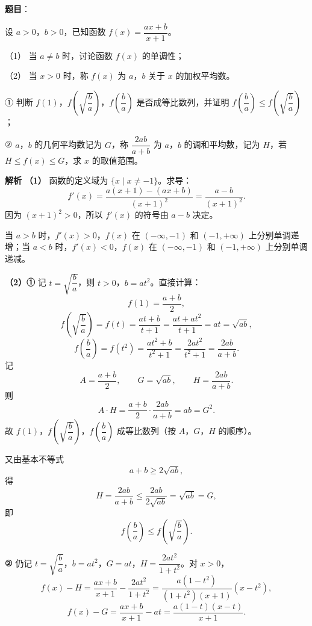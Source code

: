 \begin{answer}

\textbf{题目}：

设 $a>0$，$b>0$，已知函数 $f(x)=\dfrac{ax+b}{x+1}$。

（1） 当 $a\neq b$ 时，讨论函数 $f(x)$ 的单调性；

（2） 当 $x>0$ 时，称 $f(x)$ 为 $a$，$b$ 关于 $x$ 的加权平均数。

① 判断 $f(1)$，$f\left(\sqrt{\dfrac ba}\right)$，$f\left(\dfrac ba\right)$ 是否成等比数列，并证明 $f\left(\dfrac ba\right)\leqslant f\left(\sqrt{\dfrac ba}\right)$；

② $a$，$b$ 的几何平均数记为 $G$，称 $\dfrac{2ab}{a+b}$ 为 $a$，$b$ 的调和平均数，记为 $H$，若 $H\leqslant f(x)\leqslant G$，求 $x$ 的取值范围。

\textbf{解析}
\textbf{（1）} 函数的定义域为 $\{x\mid x\neq-1\}$。求导：
\nopagebreak[4]
\[f'(x)=\frac{a(x+1)-(ax+b)}{(x+1)^2}=\frac{a-b}{(x+1)^2}.\]
因为 $(x+1)^2>0$，所以 $f'(x)$ 的符号由 $a-b$ 决定。

当 $a>b$ 时，$f'(x)>0$，$f(x)$ 在 $(-\infty,-1)$ 和 $(-1,+\infty)$ 上分别单调递增；当 $a<b$ 时，$f'(x)<0$，$f(x)$ 在 $(-\infty,-1)$ 和 $(-1,+\infty)$ 上分别单调递减。

\textbf{（2）①} 记 $t=\sqrt{\dfrac ba}$，则 $t>0$，$b=at^2$。直接计算：
\nopagebreak[4]
\[f(1)=\frac{a+b}{2},\]
\nopagebreak[4]
\[f\left(\sqrt{\frac ba}\right)=f(t)=\frac{at+b}{t+1}
=\frac{at+at^2}{t+1}=at=\sqrt{ab},\]
\nopagebreak[4]
\[f\left(\frac ba\right)=f(t^2)=\frac{at^2+b}{t^2+1}
=\frac{2at^2}{t^2+1}
=\frac{2ab}{a+b}.\]
记
\nopagebreak[4]
\[A=\frac{a+b}{2},\qquad G=\sqrt{ab},\qquad H=\frac{2ab}{a+b}.\]
则
\nopagebreak[4]
\[A\cdot H=\frac{a+b}{2}\cdot\frac{2ab}{a+b}=ab=G^2.\]
故 $f(1)$，$f\left(\sqrt{\dfrac ba}\right)$，$f\left(\dfrac ba\right)$ 成等比数列（按 $A$，$G$，$H$ 的顺序）。

又由基本不等式
\nopagebreak[4]
\[a+b\geqslant2\sqrt{ab},\]
得
\nopagebreak[4]
\[H=\frac{2ab}{a+b}\leqslant\frac{2ab}{2\sqrt{ab}}=\sqrt{ab}=G,\]
即
\nopagebreak[4]
\[f\left(\frac ba\right)\leqslant f\left(\sqrt{\frac ba}\right).\]

\textbf{②} 仍记 $t=\sqrt{\dfrac ba}$，$b=at^2$，$G=at$，$H=\dfrac{2at^2}{1+t^2}$。对 $x>0$，
\nopagebreak[4]
\[f(x)-H=\frac{ax+b}{x+1}-\frac{2at^2}{1+t^2}
=\frac{a(1-t^2)}{(1+t^2)(x+1)}(x-t^2),\]
\nopagebreak[4]
\[f(x)-G=\frac{ax+b}{x+1}-at
=\frac{a(1-t)(x-t)}{x+1}.\]


\end{answer}
